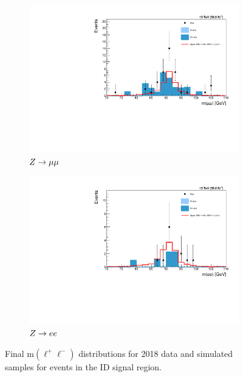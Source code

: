 \begin{figure}[htb!]
	\centering
	\captionsetup[subfigure]{justification=centering}
	\begin{subfigure}[h]{0.45\linewidth}
		\centering
		\includegraphics[width=\linewidth]{figs/05_analysis/2018_ZX_Z_mass_MU_final_tight.pdf}
		\caption{$Z\to\mu\mu$}
	\end{subfigure}
	\begin{subfigure}[h]{0.45\linewidth}
		\centering
		\includegraphics[width=\linewidth]{figs/05_analysis/2018_ZX_Z_mass_ELE_final_tight.pdf}
		\caption{$Z\to ee$}
	\end{subfigure}
	\caption[Final m$\left(\ell^+\ell^-\right)$ distributions for 2018 data and simulated samples for events in the ID signal region.]{Final m$\left(\ell^+\ell^-\right)$ distributions for 2018 data and simulated samples for events in the ID signal region.}
	\label{fig:zmass2018_final_tight}
\end{figure}

